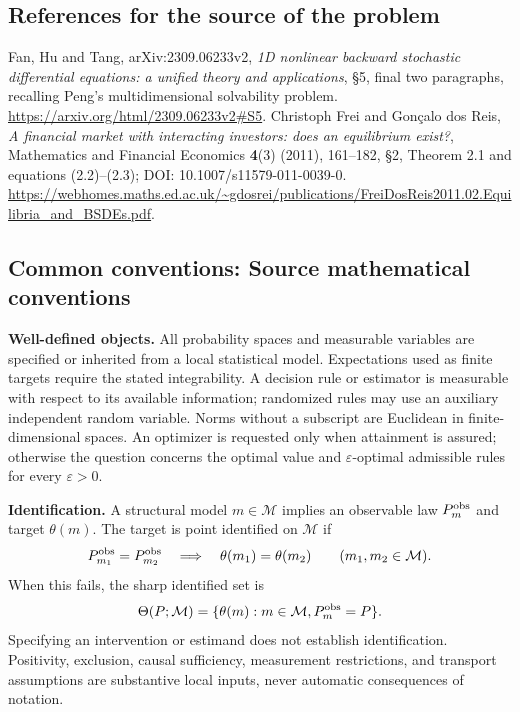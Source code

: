 \documentclass[11pt,a4paper]{article}
\begin{document}
\subsection*{References for the source of the problem}
Fan, Hu and Tang, arXiv:2309.06233v2, \emph{1D nonlinear backward
stochastic differential equations: a unified theory and applications},
\S5, final two paragraphs, recalling Peng's multidimensional solvability
problem. \url{https://arxiv.org/html/2309.06233v2#S5}.
Christoph Frei and Gon\c{c}alo dos Reis, \emph{A financial market with
interacting investors: does an equilibrium exist?}, Mathematics and
Financial Economics \textbf{4}(3) (2011), 161--182, \S2, Theorem 2.1
and equations (2.2)--(2.3); DOI: 10.1007/s11579-011-0039-0.
\url{https://webhomes.maths.ed.ac.uk/~gdosrei/publications/FreiDosReis2011.02.Equilibria_and_BSDEs.pdf}.

\subsection*{Common conventions: Source mathematical conventions}

\textbf{Well-defined objects.}
All probability spaces and measurable variables are specified or inherited
from a local statistical model. Expectations used as finite targets require
the stated integrability. A decision rule or estimator is measurable with
respect to its available information; randomized rules may use an auxiliary
independent random variable. Norms without a subscript are Euclidean in
finite-dimensional spaces. An optimizer is requested only when attainment
is assured; otherwise the question concerns the optimal value and
$\varepsilon$-optimal admissible rules for every $\varepsilon>0$.

\textbf{Identification.}
A structural model $m\in\mathcal M$ implies an observable law
$P_m^{\rm obs}$ and target $\theta(m)$. The target is point identified on
$\mathcal M$ if
\[
 P_{m_1}^{\rm obs}=P_{m_2}^{\rm obs}
 \quad\Longrightarrow\quad\theta(m_1)=\theta(m_2)
 \qquad(m_1,m_2\in\mathcal M).
\]
When this fails, the sharp identified set is
\[
 \Theta(P;\mathcal M)=\{\theta(m):m\in\mathcal M,
                                  P_m^{\rm obs}=P\}.
\]
Specifying an intervention or estimand does not establish identification.
Positivity, exclusion, causal sufficiency, measurement restrictions, and
transport assumptions are substantive local inputs, never automatic
consequences of notation.
\end{document}
